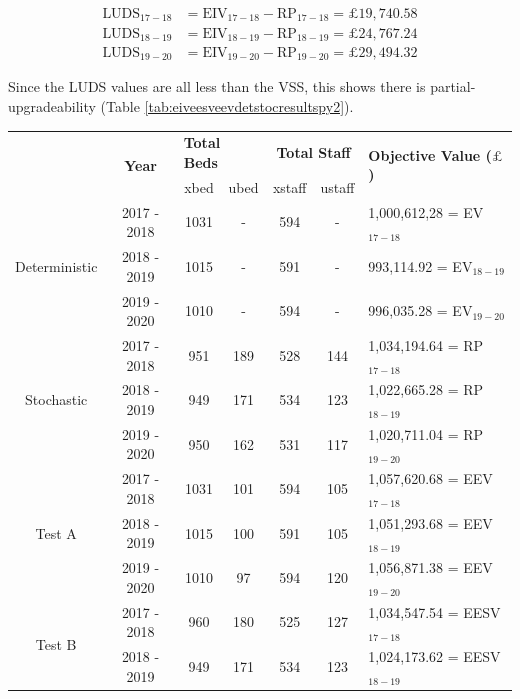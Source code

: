 \documentclass[../thesis.tex]{subfiles}
\begin{document}
\begin{align}
     \text{LUDS}_{17-18} &= \text{EIV}_{17-18} - \text{RP}_{17-18} = \pounds19,740.58   \\
    \text{LUDS}_{18-19} &= \text{EIV}_{18-19} - \text{RP}_{18-19} = \pounds24,767.24   \\
    \text{LUDS}_{19-20} &= \text{EIV}_{19-20} - \text{RP}_{19-20} = \pounds29,494.32
\end{align}

Since the LUDS values are all less than the VSS, this shows there is partial-upgradeability (Table \ref{tab:eiveesveevdetstocresultspy2}).

\begin{table}[h!]
    \centering
    \begin{tabular}{ccccccl}\toprule
 & \multirow{2}{*}{\textbf{Year}}& \multicolumn{2}{l}{\textbf{Total Beds}} & \multicolumn{2}{c}{\textbf{Total Staff}} & \multirow{2}{*}{\textbf{Objective Value ($\pounds$)}}\\ \cmidrule(lr){3-4} \cmidrule(lr){5-6}
&& xbed           & ubed          & xstaff         & ustaff         \\ \midrule
     \multirow{3}{*}{Deterministic} & 2017 - 2018 & 1031 & - &  594 & - & 1,000,612,28 =  EV$_{17-18}$ \\ 
      & 2018 - 2019 & 1015 & - & 591 & - & 993,114.92 =  EV$_{18-19}$ \\
      & 2019 - 2020 & 1010 & - & 594 & - & 996,035.28 =  EV$_{19-20}$\\\midrule
     \multirow{3}{*}{Stochastic} & 2017 - 2018 & 951 & 189 & 528 & 144 & 1,034,194.64 =  RP$_{17-18}$ \\ 
      & 2018 - 2019 & 949 & 171 & 534 & 123 & 1,022,665.28 =  RP$_{18-19}$ \\
      & 2019 - 2020 & 950 & 162 & 531 & 117 & 1,020,711.04 =  RP$_{19-20}$\\ \midrule
      \multirow{3}{*}{Test A} & 2017 - 2018 &1031 & 101 & 594 & 105 & 1,057,620.68 = EEV$_{17-18}$\\
      & 2018 - 2019 &1015 & 100 & 591 & 105 & 1,051,293.68 = EEV$_{18-19}$\\
      & 2019 - 2020 &1010 & 97 & 594 & 120 & 1,056,871.38 = EEV$_{19-20}$\\\midrule
      \multirow{3}{*}{Test B} & 2017 - 2018 &960 & 180 & 525 & 127 & 1,034,547.54 = EESV$_{17-18}$\\
      & 2018 - 2019 &949 & 171 & 534 & 123 & 1,024,173.62 = EESV$_{18-19}$\\

\end{tabular}
\end{table}
\end{document}
